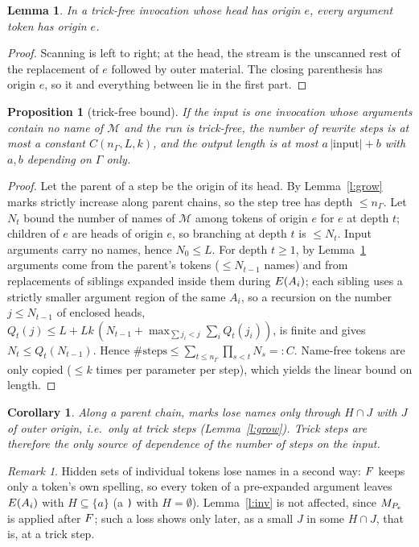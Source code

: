 \documentclass[10pt]{article}
\newtheorem{lemma}[theorem]{Lemma}
\newtheorem{proposition}[theorem]{Proposition}
\newtheorem{corollary}[theorem]{Corollary}
\theoremstyle{definition}
\theoremstyle{remark}
\newtheorem{remark}[theorem]{Remark}
\newcommand{\tok}[1]{\texttt{#1}}
\begin{document}
\begin{lemma}\label{l:args}
In a trick-free invocation whose head has origin $e$, every argument token has origin $e$.
\end{lemma}
\begin{proof}
Scanning is left to right; at the head, the stream is the unscanned rest of the replacement of $e$ followed by outer
material. The closing parenthesis has origin $e$, so it and everything between lie in the first part.
\end{proof}

\begin{proposition}[trick-free bound]\label{p:free}
If the input is one invocation whose arguments contain no name of $\mathcal M$ and the run is trick-free, the number of
rewrite steps is at most a constant $C(n_\Gamma,L,k)$, and the output length is at most $a\,|\text{input}|+b$ with
$a,b$ depending on $\Gamma$ only.
\end{proposition}
\begin{proof}
Let the parent of a step be the origin of its head. By Lemma~\ref{l:grow} marks strictly increase along parent chains,
so the step tree has depth $\le n_\Gamma$. Let $N_t$ bound the number of names of $\mathcal M$ among tokens of origin
$e$ for $e$ at depth $t$; children of $e$ are heads of origin $e$, so branching at depth $t$ is $\le N_t$. Input
arguments carry no names, hence $N_0\le L$. For depth $t\ge1$, by Lemma~\ref{l:args} arguments come from the parent's
tokens ($\le N_{t-1}$ names) and from replacements of siblings expanded inside them during $E(A_i)$; each sibling
uses a strictly smaller argument region of the same $A_i$, so a recursion on the number $j\le N_{t-1}$ of enclosed heads,
$Q_t(j)\le L+Lk\,(N_{t-1}+\max_{\sum j_i<j}\sum_i Q_t(j_i))$, is finite and gives $N_t\le Q_t(N_{t-1})$. Hence
$\#\text{steps}\le\sum_{t\le n_\Gamma}\prod_{s<t}N_s=:C$. Name-free tokens are only copied ($\le k$ times per
parameter per step), which yields the linear bound on length.
\end{proof}

\begin{corollary}\label{c:only}
Along a parent chain, marks lose names only through $H\cap J$ with $J$ of outer origin, i.e.\ only at trick steps
(Lemma~\ref{l:grow}). Trick steps are therefore the only source of dependence of the number of steps on the input.
\end{corollary}
\begin{remark}
Hidden sets of individual tokens lose names in a second way: $F$ keeps only a token's own spelling, so every token of
a pre-expanded argument leaves $E(A_i)$ with $H\subseteq\{a\}$ (a \tok{)} with $H=\emptyset$). Lemma~\ref{l:inv} is not
affected, since $M_{P_e}$ is applied after $F$; such a loss shows only later, as a small $J$ in some $H\cap J$, that
is, at a trick step.
\end{remark}
\end{document}
